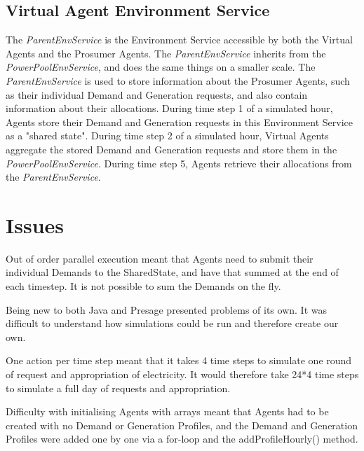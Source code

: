 \subsection*{Virtual Agent Environment Service}
The \textit{ParentEnvService} is the Environment Service accessible by both the Virtual Agents and the Prosumer Agents. The \textit{ParentEnvService} inherits from the \textit{PowerPoolEnvService}, and does the same things on a smaller scale. The \textit{ParentEnvService} is used to store information about the Prosumer Agents, such as their individual Demand and Generation requests, and also contain information about their allocations. During time step 1 of a simulated hour, Agents store their Demand and Generation requests in this Environment Service as a "shared state". During time step 2 of a simulated hour, Virtual Agents aggregate the stored Demand and Generation requests and store them in the \textit{PowerPoolEnvService}. During time step 5, Agents retrieve their allocations from the \textit{ParentEnvService}.


\section*{Issues}
Out of order parallel execution meant that Agents need to submit their individual Demands to the SharedState, and have that summed at the end of each timestep. It is not possible to sum the Demands on the fly.

Being new to both Java and Presage presented problems of its own. It was difficult to understand how simulations could be run and therefore create our own.

One action per time step meant that it takes 4 time steps to simulate one round of request and appropriation of electricity. It would therefore take 24*4 time steps to simulate a full day of requests and appropriation.

Difficulty with initialising Agents with arrays meant that Agents had to be created with no Demand or Generation Profiles, and the Demand and Generation Profiles were added one by one via a for-loop and the addProfileHourly() method.


